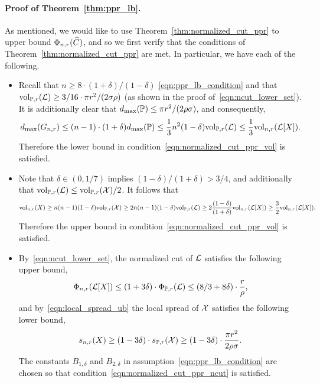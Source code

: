\paragraph{Proof of Theorem~\ref{thm:ppr_lb}.}
	As mentioned, we would like to use Theorem~\ref{thm:normalized_cut_ppr} to upper bound $\Phi_{n,r}(\widehat{C})$, and so we first verify that the conditions of Theorem~\ref{thm:normalized_cut_ppr} are met. In particular, we have each of the following.
	\begin{itemize}
		\item Recall that $n \geq 8 \cdot (1 + \delta)/(1 - \delta)$ \eqref{eqn:ppr_lb_condition} and that $\mathrm{vol}_{\mathbb{P},r}(\mathcal{L}) \geq 3/16 \cdot \pi r^2/(2\sigma\rho)$ (as shown in the proof of~\eqref{eqn:ncut_lower_set}). It is additionally clear that $d_{\max}(\mathbb{P}) \leq \pi r^2 /(2\rho\sigma)$, and consequently,
		\begin{equation}
		\label{pf:ppr_lb_1}
		d_{\max}(G_{n,r}) \leq (n - 1) \cdot (1 + \delta) d_{\max}(\mathbb{P}) \leq \frac{1}{3}n^2 (1 - \delta) \mathrm{vol}_{\mathbb{P},r}(\mathcal{L}) \leq \frac{1}{3}\mathrm{vol}_{n,r}(\mathcal{L}[X]).
		\end{equation}
		Therefore the lower bound in condition~\eqref{eqn:normalized_cut_ppr_vol} is satisfied.
		\item Note that $\delta \in (0,1/7)$ implies $(1 - \delta)/(1 + \delta) > 3/4$, and additionally that $\mathrm{vol}_{\mathbb{P},r}(\mathcal{L}) \leq \mathrm{vol}_{\mathbb{P},r}(\mathcal{X})/2$. It follows that
		\begin{equation}
		\label{pf:ppr_lb_2}
		\mathrm{vol}_{n,r}(X) \geq n(n - 1)(1 - \delta) \mathrm{vol}_{\mathbb{P},r}(\mathcal{X}) \geq 2n(n - 1) (1 - \delta) \mathrm{vol}_{\mathbb{P},r}(\mathcal{L}) \geq 2\frac{(1 - \delta)}{(1 + \delta)} \mathrm{vol}_{n,r}(\mathcal{L}[X]) \geq \frac{3}{2} \mathrm{vol}_{n,r}(\mathcal{L}[X]).
		\end{equation}
		Therefore the upper bound in condition~\eqref{eqn:normalized_cut_ppr_vol} is satisfied.
		\item By~\eqref{eqn:ncut_lower_set}, the normalized cut of $\mathcal{L}$ satisfies the following upper bound,
		\begin{equation}
		\Phi_{n,r}(\mathcal{L}[X]) \leq (1 + 3\delta) \cdot \Phi_{\mathbb{P},r}(\mathcal{L}) \leq (8/3 + 8\delta) \cdot  \frac{r}{\rho}, 
		\end{equation}
		and by~\eqref{eqn:local_spread_ub} the local spread of $\mathcal{X}$ satisfies the following lower bound,
		\begin{equation}
		s_{n,r}(X) \geq (1 - 3\delta) \cdot s_{\mathbb{P},r}(\mathcal{X}) \geq (1 - 3\delta) \cdot \frac{\pi r^2}{2\rho\sigma}.
		\end{equation}
		The constants $B_{1,\delta}$ and $B_{2,\delta}$ in assumption~\eqref{eqn:ppr_lb_condition} are chosen so that condition~\eqref{eqn:normalized_cut_ppr_ncut} is satisfied.
	\end{itemize}
